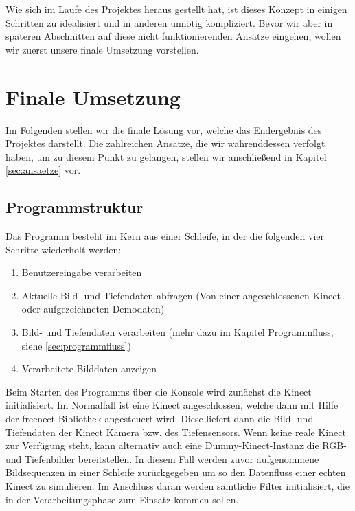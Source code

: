 \documentclass[12pt,a4paper,ngerman]{scrartcl}
\begin{document}
Wie sich im Laufe des Projektes heraus gestellt hat, ist dieses Konzept in einigen Schritten zu idealisiert und in anderen unnötig
kompliziert. Bevor wir aber in späteren Abschnitten auf diese nicht funktionierenden
Ansätze eingehen, wollen wir zuerst unsere finale Umsetzung vorstellen.

\section{Finale Umsetzung}
\label{sec:final}

Im Folgenden stellen wir die finale Lösung vor, welche das Endergebnis des
Projektes darstellt. Die zahlreichen Ansätze, die wir währenddessen verfolgt haben, um zu
diesem Punkt zu gelangen, stellen wir anschließend in Kapitel \ref{sec:ansaetze} vor.

\subsection{Programmstruktur}

Das Programm besteht im Kern aus einer Schleife, in der die folgenden vier Schritte  wiederholt werden:
\begin{enumerate}
  \item Benutzereingabe verarbeiten
  \item Aktuelle Bild- und Tiefendaten abfragen (Von einer angeschlossenen Kinect oder aufgezeichneten Demodaten)
  \item Bild- und Tiefendaten verarbeiten (mehr dazu im Kapitel Programmfluss, siehe \ref{sec:programmfluss})
  \item Verarbeitete Bilddaten anzeigen
\end{enumerate}

Beim Starten des Programms über die Konsole wird zunächst die Kinect initialisiert.
Im Normalfall ist eine Kinect angeschlossen, welche dann mit Hilfe der freenect Bibliothek \cite{libfreenect} angesteuert wird. Diese liefert dann die Bild- und Tiefendaten der Kinect Kamera bzw. des Tiefensensors. Wenn keine reale Kinect zur Verfügung steht, kann alternativ auch eine Dummy-Kinect-Instanz die RGB- und Tiefenbilder bereitstellen. In diesem Fall werden zuvor aufgenommene Bildsequenzen in einer Schleife zurückgegeben um so den Datenfluss einer echten Kinect zu simulieren.
Im Anschluss daran werden sämtliche Filter initialisiert, die in der Verarbeitungsphase zum Einsatz kommen sollen.
\end{document}
